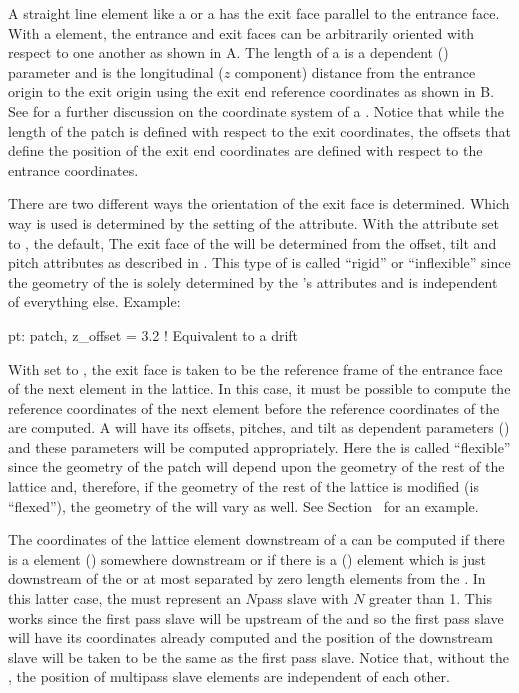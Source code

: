 {A straight line element like a  or a  has the exit face parallel to the
entrance face. With a  element, the entrance and exit faces can be arbitrarily oriented
with respect to one another as shown in A. The length  of a  is a
dependent () parameter and is the longitudinal ($z$ component) distance from the
entrance origin to the exit origin using the exit end reference coordinates as shown in
B. See  for a further discussion on the coordinate system of a
. Notice that while the length of the patch is defined with respect to the exit
coordinates, the offsets that define the position of the exit end coordinates are defined with
respect to the entrance coordinates.

There are two different ways the orientation of the exit face is determined. Which way is used is
determined by the setting of the  attribute.  With the  attribute set to
, the default, The exit face of the  will be determined from the offset, tilt
and pitch attributes as described in . This type of  is called
``rigid'' or ``inflexible'' since the geometry of the  is solely determined by the
's attributes and is independent of everything else.  Example:
\begin{example}
  pt: patch, z_offset = 3.2   ! Equivalent to a drift
\end{example}

With  set to , the exit face is taken to be the reference frame of the
entrance face of the next element in the lattice. In this case, it must be possible to compute the
reference coordinates of the next element before the reference coordinates of the  are
computed. A   will have its offsets, pitches, and tilt as dependent
parameters () and these parameters will be computed appropriately. Here the
 is called ``flexible'' since the geometry of the patch will depend upon the geometry of
the rest of the lattice and, therefore, if the geometry of the rest of the lattice is modified (is
``flexed''), the geometry of the  will vary as well. See Section~ for an
example.

The coordinates of the lattice element downstream of a   can be computed
if there is a  element () somewhere downstream or if there is a
 () element which is just downstream of the  or at
most separated by zero length elements from the . In this latter case, the
 must represent an $N$\Th pass slave with $N$ greater than 1. This works since
the first pass slave will be upstream of the  and so the first pass slave will have its
coordinates already computed and the position of the downstream slave will be taken to be the same
as the first pass slave. Notice that, without the , the position of multipass slave
elements are independent of each other.

}
